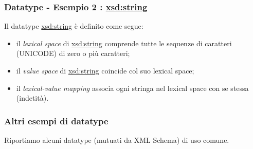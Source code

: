 \documentclass[8pt]{beamer}
\begin{document}
\begin{frame}
\frametitle{Datatype - Esempio 2 : \url{xsd:string}}
Il datatype \url{xsd:string} \`e definito come segue:

\begin{itemize}
 \item il \emph{lexical space} di \url{xsd:string} comprende 
 tutte le sequenze di caratteri (UNICODE) di zero o pi\`u caratteri;
 \item il \emph{value space} di \url{xsd:string} coincide col suo 
 lexical space;
 \item il \emph{lexical-value mapping} associa ogni stringa nel lexical space
 con se stessa (indetit\`a).
 \end{itemize}
\end{frame}

\begin{frame}
 \frametitle{Altri esempi di datatype}
Riportiamo alcuni datatype (mutuati da XML Schema) di uso comune.


\end{frame}
\end{document}

